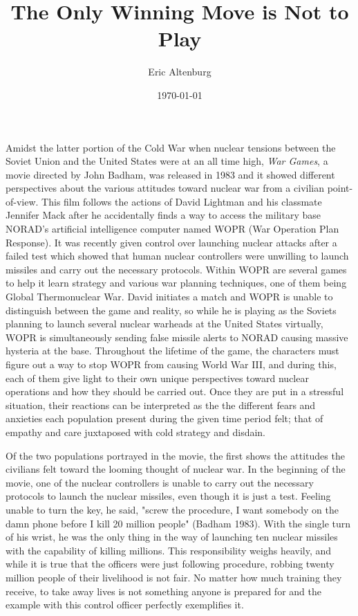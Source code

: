 \documentclass[12pt]{turabian-researchpaper}
\title{The Only Winning Move is Not to Play}
\author{Eric Altenburg}
\date{\today}
\begin{document}
\maketitle

\newpage

Amidst the latter portion of the Cold War when nuclear tensions between the Soviet Union and the United States were at an all time high, \textit{War Games}, a movie directed by John Badham, was released in 1983 and it showed different perspectives about the various attitudes toward nuclear war from a civilian point-of-view. This film follows the actions of David Lightman and his classmate Jennifer Mack after he accidentally finds a way to access the military base NORAD’s artificial intelligence computer named WOPR (War Operation Plan Response). It was recently given control over launching nuclear attacks after a failed test which showed that human nuclear controllers were unwilling to launch missiles and carry out the necessary protocols. Within WOPR are several games to help it learn strategy and various war planning techniques, one of them being Global Thermonuclear War. David initiates a match and WOPR is unable to distinguish between the game and reality, so while he is playing as the Soviets planning to launch several nuclear warheads at the United States virtually, WOPR is simultaneously sending false missile alerts to NORAD causing massive hysteria at the base. Throughout the lifetime of the game, the characters must figure out a way to stop WOPR from causing World War III, and during this, each of them give light to their own unique perspectives toward nuclear operations and how they should be carried out. Once they are put in a stressful situation, their reactions can be interpreted as the the different fears and anxieties each population present during the given time period felt; that of empathy and care juxtaposed with cold strategy and disdain. 

Of the two populations portrayed in the movie, the first shows the attitudes the civilians felt toward the looming thought of nuclear war. In the beginning of the movie, one of the nuclear controllers is unable to carry out the necessary protocols to launch the nuclear missiles, even though it is just a test. Feeling unable to turn the key, he said, "screw the procedure, I want somebody on the damn phone before I kill 20 million people" (Badham 1983). With the single turn of his wrist, he was the only thing in the way of launching ten nuclear missiles with the capability of killing millions. This responsibility weighs heavily, and while it is true that the officers were just following procedure, robbing twenty million people of their livelihood is not fair. No matter how much training they receive, to take away lives is not something anyone is prepared for and the example with this control officer perfectly exemplifies it. 
\end{document}
